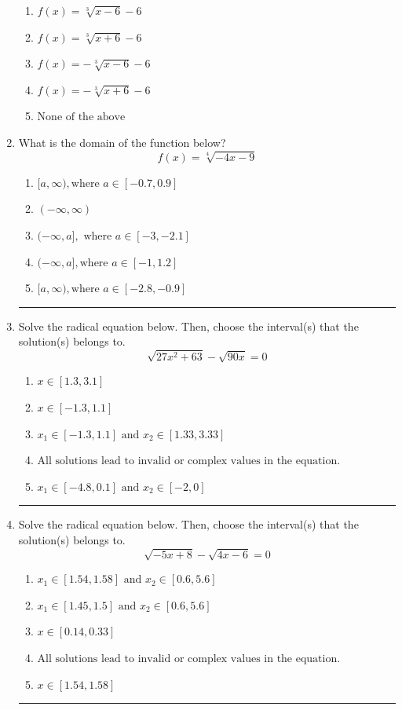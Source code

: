 \documentclass[14pt]{extbook}
\newcommand{\litem}[1]{\item#1\hspace*{-1cm}\rule{\textwidth}{0.4pt}}
\begin{document}
\begin{enumerate}
{\begin{center}
\end{center}
\begin{enumerate}[label=\Alph*.]
\item \( f(x) = \sqrt[3]{x - 6} - 6 \)
\item \( f(x) = \sqrt[3]{x + 6} - 6 \)
\item \( f(x) = - \sqrt[3]{x - 6} - 6 \)
\item \( f(x) = - \sqrt[3]{x + 6} - 6 \)
\item \( \text{None of the above} \)

\end{enumerate} }
\litem{
What is the domain of the function below?\[ f(x) = \sqrt[4]{-4 x - 9} \]\begin{enumerate}[label=\Alph*.]
\item \( [a, \infty), \text{where } a \in [-0.7, 0.9] \)
\item \( (-\infty, \infty) \)
\item \( (-\infty, a], \text{ where } a \in [-3, -2.1] \)
\item \( (-\infty, a], \text{where } a \in [-1, 1.2] \)
\item \( [a, \infty), \text{where } a \in [-2.8, -0.9] \)

\end{enumerate} }
\litem{
Solve the radical equation below. Then, choose the interval(s) that the solution(s) belongs to.\[ \sqrt{27 x^2 + 63} - \sqrt{90 x} = 0 \]\begin{enumerate}[label=\Alph*.]
\item \( x \in [1.3,3.1] \)
\item \( x \in [-1.3,1.1] \)
\item \( x_1 \in [-1.3, 1.1] \text{ and } x_2 \in [1.33,3.33] \)
\item \( \text{All solutions lead to invalid or complex values in the equation.} \)
\item \( x_1 \in [-4.8, 0.1] \text{ and } x_2 \in [-2,0] \)

\end{enumerate} }
\litem{
Solve the radical equation below. Then, choose the interval(s) that the solution(s) belongs to.\[ \sqrt{-5 x + 8} - \sqrt{4 x - 6} = 0 \]\begin{enumerate}[label=\Alph*.]
\item \( x_1 \in [1.54, 1.58] \text{ and } x_2 \in [0.6,5.6] \)
\item \( x_1 \in [1.45, 1.5] \text{ and } x_2 \in [0.6,5.6] \)
\item \( x \in [0.14,0.33] \)
\item \( \text{All solutions lead to invalid or complex values in the equation.} \)
\item \( x \in [1.54,1.58] \)

\end{enumerate} }
\end{enumerate}
\end{document}
